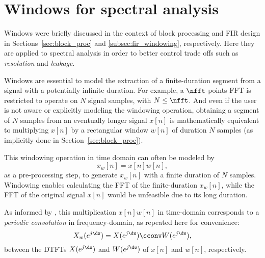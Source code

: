 

\section{Windows for spectral analysis}
\label{sec:windows}

Windows were briefly discussed in the context of block processing and FIR design in Sections~\ref{sec:block_proc} and  \ref{subsec:fir_windowing}, respectively. Here they are applied to spectral analysis in order to better control trade offs such as \emph{resolution} and \emph{leakage}.

Windows are essential to model the extraction of a finite-duration segment from a signal with a potentially infinite duration. For example, a $\nfft$-points FFT is restricted to operate on $N$ signal samples, with $N \le \nfft$. And even if the user is not aware or explicitly modeling the windowing operation, obtaining a segment of $N$ samples from an eventually longer signal $x[n]$ is mathematically equivalent to multiplying $x[n]$ by a rectangular window $w[n]$ of duration $N$ samples (as implicitly done in Section~\ref{sec:block_proc}).

This windowing operation in time domain can often be modeled by
\begin{equation}
x_w[n] = x[n] w[n],
\label{eq:time_domain_windowing}
\end{equation}
as a pre-processing step, to generate $x_w[n]$ with a finite duration of $N$ samples. Windowing enables calculating the FFT of the finite-duration $x_w[n]$, while the FFT of the original signal $x[n]$ would be unfeasible due to its long duration.

As informed by , this multiplication $x[n] w[n]$ in time-domain corresponds to a \emph{periodic convolution} in frequency-domain, as repeated here for convenience:
\begin{equation}
X_w(e^{j \dw}) = X(e^{j \dw}) \cconv W(e^{j \dw}),
\label{eq:freq_domain_windowing}
\end{equation}
between the DTFTs $X(e^{j \dw})$ and $W(e^{j \dw})$ of $x[n]$ and $w[n]$, respectively.

